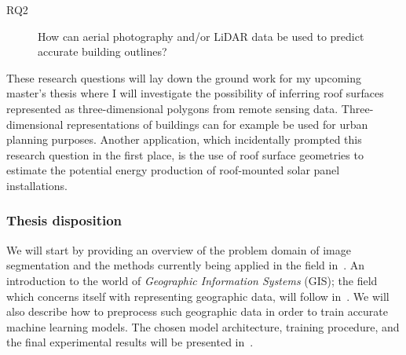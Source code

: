 \begin{description}
  \item[RQ2] How can aerial photography and/or LiDAR data be used to predict accurate building outlines?
\end{description}

These research questions will lay down the ground work for my upcoming master's thesis where I will investigate the possibility of inferring roof surfaces represented as three-dimensional polygons from remote sensing data.
Three-dimensional representations of buildings can for example be used for urban planning purposes.
Another application, which incidentally prompted this research question in the first place, is the use of roof surface geometries to estimate the potential energy production of roof-mounted solar panel installations.

\subsubsection*{Thesis disposition}

We will start by providing an overview of the problem domain of image segmentation and the methods currently being applied in the field in~.
An introduction to the world of \textit{Geographic Information Systems} (GIS); the field which concerns itself with representing geographic data, will follow in~.
We will also describe how to preprocess such geographic data in order to train accurate machine learning models.
The chosen model architecture, training procedure, and the final experimental results will be presented in~.
